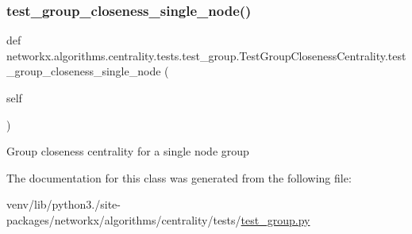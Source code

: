 \subsubsection{\texorpdfstring{test\+\_\+group\+\_\+closeness\+\_\+single\+\_\+node()}{test\_group\_closeness\_single\_node()}}
{\footnotesize\ttfamily def networkx.\+algorithms.\+centrality.\+tests.\+test\+\_\+group.\+Test\+Group\+Closeness\+Centrality.\+test\+\_\+group\+\_\+closeness\+\_\+single\+\_\+node (\begin{DoxyParamCaption}\item[{}]{self }\end{DoxyParamCaption})}

\begin{DoxyVerb}Group closeness centrality for a single node group
\end{DoxyVerb}
 

The documentation for this class was generated from the following file\+:\begin{DoxyCompactItemize}
\item 
venv/lib/python3./site-\/packages/networkx/algorithms/centrality/tests/\hyperlink{test__group_8py}{test\+\_\+group.\+py}\end{DoxyCompactItemize}
